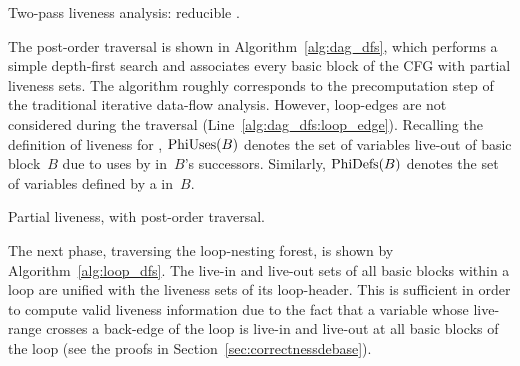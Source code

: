 \begin{algorithm}[H]
    \caption{Two-pass liveness analysis: reducible \@CFG.}
  \label{alg:twopass}
\end{algorithm}

The post-order traversal is shown in Algorithm~\ref{alg:dag_dfs}, which performs a simple depth-first search and associates every basic block of the CFG with partial liveness sets.
The algorithm roughly corresponds to the precomputation step of the traditional iterative data-flow analysis.
However, loop-edges are not considered during the traversal (Line~\ref{alg:dag_dfs:loop_edge}).
Recalling the definition of liveness for \phifuns, $\textrm{PhiUses}(B)$ denotes the set of variables live-out of basic block~$B$ due to uses by \phifuns in~$B$'s successors.
Similarly, $\textrm{PhiDefs}(B)$ denotes the set of variables defined by a \phifun in~$B$.

\begin{algorithm}[H]
  \caption{Partial liveness, with post-order traversal.}
  \label{alg:dag_dfs}
\end{algorithm}

The next phase, traversing the loop-nesting forest, is shown by Algorithm~\ref{alg:loop_dfs}.
The live-in and live-out sets of all basic blocks within a loop are unified with the liveness sets of its loop-header.
This is sufficient in order to compute valid liveness information due to the fact that a variable whose live-range crosses a back-edge of the loop is live-in and live-out at all basic blocks of the loop (see the proofs in Section~\ref{sec:correctnessdebase}).

